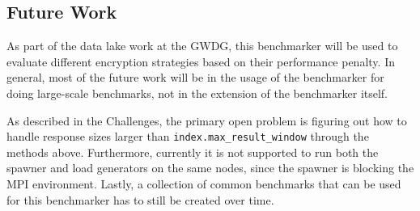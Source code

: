 \subsection{Future Work}
As part of the data lake work at the GWDG, this benchmarker will be used to evaluate different encryption strategies based on their performance penalty. In general, most of the future work will be in the usage of the benchmarker for doing large-scale benchmarks, not in the extension of the benchmarker itself. 

As described in the Challenges, the primary open problem is figuring out how to handle response sizes larger than \texttt{index.max\_result\_window} through the methods above. Furthermore, currently it is not supported to run both the spawner and load generators on the same nodes, since the spawner is blocking the MPI environment. Lastly, a collection of common benchmarks that can be used for this benchmarker has to still be created over time.
